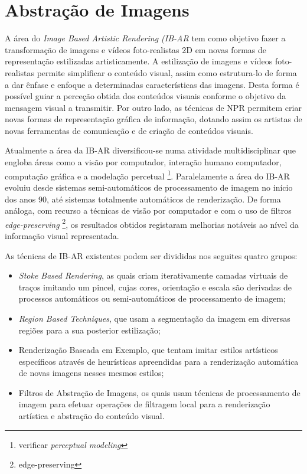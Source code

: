 \chapter{Abstração de Imagens} \label{chap:abstracao}

A área do \textit{Image Based Artistic Rendering (IB-AR} tem como objetivo fazer a transformação de imagens e vídeos foto-realistas 2D em novas formas de representação estilizadas artisticamente. A estilização de imagens e vídeos foto-realistas permite simplificar o conteúdo visual, assim como estrutura-lo de forma a dar ênfase e enfoque a determinadas características das imagens. Desta forma é possível guiar a perceção obtida dos conteúdos visuais conforme o objetivo da mensagem visual a transmitir. Por outro lado, as técnicas de NPR  permitem criar novas formas de representação gráfica de informação, dotando assim os artistas de novas ferramentas de comunicação e de criação de conteúdos visuais. 

Atualmente a área da IB-AR diversificou-se numa atividade multidisciplinar que engloba áreas como a visão por computador, interação humano computador, computação gráfica e a modelação percetual \footnote{verificar \textit{perceptual modeling}}. Paralelamente a área do IB-AR evoluiu desde sistemas semi-automáticos de processamento de imagem no início dos anos 90, até sistemas totalmente automáticos de renderização. De forma análoga, com recurso a técnicas de visão por computador e com o uso de filtros \textit{edge-preserving} \footnote{edge-preserving}, os resultados obtidos registaram melhorias notáveis ao nível da informação visual representada.  

As técnicas de IB-AR existentes podem ser divididas nos seguites quatro grupos\cite{Kyprianidis2012}:
\begin{itemize}
\item \textit{Stoke Based Rendering}, as quais criam iterativamente camadas virtuais de traços imitando um pincel, cujas cores, orientação e escala são derivadas de processos automáticos ou semi-automáticos de processamento de imagem; 
\item \textit{Region Based Techniques}, que usam a segmentação da imagem em diversas regiões para a sua posterior estilização; 
\item Renderização Baseada em Exemplo, que tentam imitar estilos artísticos específicos através de heurísticas apreendidas para a renderização automática de novas imagens nesses mesmos estilos;
\item Filtros de Abstração de Imagens, os quais usam técnicas de processamento de imagem para efetuar operações de filtragem local para a renderização artística e abstração  do conteúdo visual.
\end{itemize}

